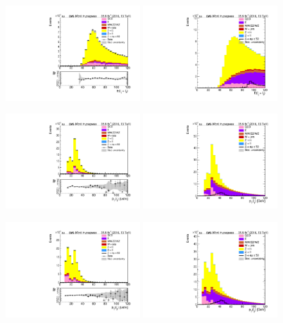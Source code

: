 \begin{figure}[htp]
	\includegraphics[width=0.45\textwidth]{plots/em/EnergySum_CR.pdf}
	\includegraphics[width=0.45\textwidth]{plots/em/EnergySum_withsignal.pdf}

	\includegraphics[width=0.45\textwidth]{plots/em/TransverseMomentum1_CR.pdf}
	\includegraphics[width=0.45\textwidth]{plots/em/TransverseMomentum1_withsignal.pdf}

	\includegraphics[width=0.45\textwidth]{plots/em/TransverseMomentum2_CR.pdf}
	\includegraphics[width=0.45\textwidth]{plots/em/TransverseMomentum2_withsignal.pdf}
\end{figure}


